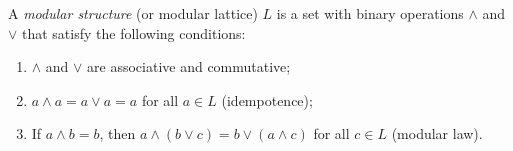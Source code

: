 A \emph{modular structure} (or modular lattice) $L$ is a set with binary operations $\wedge$ and $\vee$ that satisfy the following conditions:

\begin{enumerate}
\item[(a)] $\wedge$ and $\vee$ are associative and commutative;
\item[(b)] $a \wedge a = a \vee a = a$ for all $a \in L$ (idempotence);
\item[(c)] If $a \wedge b = b$, then $a \wedge (b \vee c) = b \vee (a \wedge c)$ for all $c \in L$ (modular law).
\end{enumerate}

